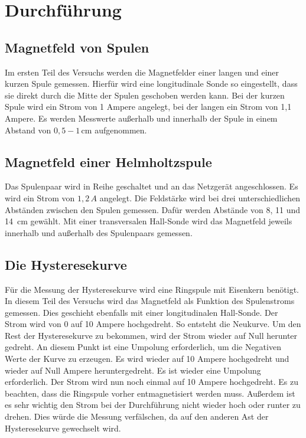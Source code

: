 

\section{Durchführung}
\subsection{Magnetfeld von Spulen}
Im ersten Teil des Versuchs werden die Magnetfelder einer langen und einer kurzen Spule gemessen.
Hierfür wird eine longitudinale Sonde so eingestellt,
dass sie direkt durch die Mitte der Spulen geschoben werden kann.
Bei der kurzen Spule wird ein Strom von 1 Ampere  angelegt,
bei der langen ein Strom von 1,1 Ampere.
Es werden Messwerte außerhalb und innerhalb der Spule
in einem Abstand von $0,5 -1\, \mathrm{cm}$ aufgenommen.
\subsection{Magnetfeld einer Helmholtzspule}
Das Spulenpaar wird in Reihe geschaltet und an das Netzgerät angeschlossen.
Es wird ein Strom von $1,2\, A$ angelegt.
Die Feldstärke wird bei drei unterschiedlichen Abständen zwischen den Spulen gemessen.
Dafür werden Abstände von 8, 11 und 14\, $\mathrm{cm}$ gewählt.
Mit einer transversalen Hall-Sonde wird das Magnetfeld jeweils innerhalb und außerhalb des Spulenpaars gemessen.
\subsection{Die Hysteresekurve}
Für die Messung der Hysteresekurve wird eine Ringspule mit Eisenkern benötigt.
In diesem Teil des Versuchs wird das Magnetfeld als Funktion des Spulenstroms gemessen.
Dies geschieht ebenfalls mit einer longitudinalen Hall-Sonde.
Der Strom wird von 0 auf 10 Ampere hochgedreht. So entsteht die Neukurve.
Um den Rest der Hysteresekurve zu bekommen,
wird der Strom wieder auf Null herunter gedreht.
An diesem Punkt ist eine Umpolung erforderlich, um die Negativen Werte der Kurve zu erzeugen.
Es wird wieder auf 10 Ampere hochgedreht und wieder auf Null Ampere heruntergedreht.
Es ist wieder eine Umpolung erforderlich.
Der Strom wird nun noch einmal auf 10 Ampere hochgedreht.
Es zu beachten, dass die Ringspule vorher entmagnetisiert werden muss.
Außerdem ist es sehr wichtig den Strom bei der Durchführung nicht wieder hoch oder runter zu drehen.
Dies würde die Messung verfälschen, da auf den anderen Ast der Hysteresekurve gewechselt wird.
